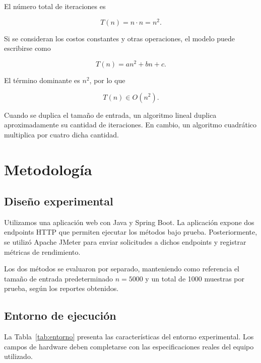 \documentclass[runningheads]{llncs}
\begin{document}
El número total de iteraciones es

\begin{equation}
T(n)=n \cdot n=n^2.
\end{equation}

Si se consideran los costos constantes y otras
operaciones, el modelo puede escribirse como

\begin{equation}
T(n)=an^2+bn+c.
\end{equation}

El término dominante es $n^2$, por lo que

\begin{equation}
T(n) \in O(n^2).
\end{equation}

Cuando se duplica el tamaño de entrada, un
algoritmo lineal duplica aproximadamente su
cantidad de iteraciones. En cambio, un algoritmo
cuadrático multiplica por cuatro dicha cantidad.

\section{Metodología}

\subsection{Diseño experimental}

Utilizamos una aplicación web con Java
y Spring Boot. La aplicación expone dos endpoints
HTTP que permiten ejecutar los métodos bajo prueba.
Posteriormente, se utilizó Apache JMeter para enviar
solicitudes a dichos endpoints y registrar métricas
de rendimiento.

Los dos métodos se evaluaron por separado,
manteniendo como referencia el tamaño de entrada
predeterminado $n=5000$ y un total de 1000 muestras
por prueba, según los reportes obtenidos.

\subsection{Entorno de ejecución}

La Tabla~\ref{tab:entorno} presenta las
características del entorno experimental. Los
campos de hardware deben completarse con las
especificaciones reales del equipo utilizado.
\end{document}
